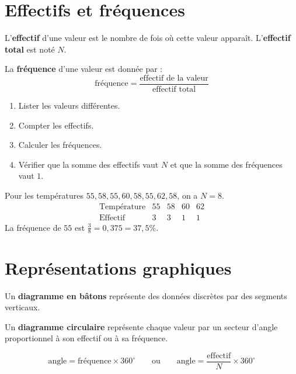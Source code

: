 \documentclass[11pt,a4paper,twoside]{book}
\begin{document}
\section{Effectifs et fréquences}
\begin{definitionbox}
L'\textbf{effectif} d'une valeur est le nombre de fois où cette valeur apparaît.
L'\textbf{effectif total} est noté \(N\).

La \textbf{fréquence} d'une valeur est donnée par :
\[
\text{fréquence}=\frac{\text{effectif de la valeur}}{\text{effectif total}}
\]
\end{definitionbox}

\begin{methodebox}
\begin{enumerate}
\item Lister les valeurs différentes.
\item Compter les effectifs.
\item Calculer les fréquences.
\item Vérifier que la somme des effectifs vaut \(N\) et que la somme des fréquences vaut \(1\).
\end{enumerate}
\end{methodebox}

\begin{exemplebox}
Pour les températures \(55,58,55,60,58,55,62,58\), on a \(N=8\).
\[
\begin{array}{c|cccc}
\text{Température} & 55 & 58 & 60 & 62\\ \hline
\text{Effectif} & 3 & 3 & 1 & 1
\end{array}
\]
La fréquence de \(55\) est \(\frac{3}{8}=0{,}375=37{,}5\%\).
\end{exemplebox}

\section{Représentations graphiques}
\begin{definitionbox}
Un \textbf{diagramme en bâtons} représente des données discrètes par des segments verticaux.

Un \textbf{diagramme circulaire} représente chaque valeur par un secteur d'angle
proportionnel à son effectif ou à sa fréquence.
\end{definitionbox}

\begin{methodebox}
\[
\text{angle}=\text{fréquence}\times 360^\circ
\qquad\text{ou}\qquad
\text{angle}=\frac{\text{effectif}}{N}\times 360^\circ
\]
\end{methodebox}
\end{document}
